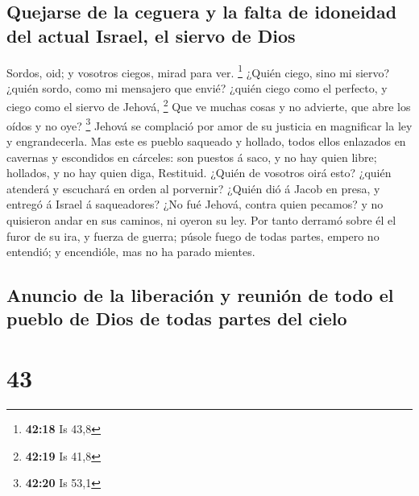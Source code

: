 \hypertarget{quejarse-de-la-ceguera-y-la-falta-de-idoneidad-del-actual-israel-el-siervo-de-dios}{%
\subsection{Quejarse de la ceguera y la falta de idoneidad del actual
Israel, el siervo de
Dios}\label{quejarse-de-la-ceguera-y-la-falta-de-idoneidad-del-actual-israel-el-siervo-de-dios}}

 Sordos, oid; y vosotros ciegos, mirad para ver.
\footnote{\textbf{42:18} Is 43,8}  ¿Quién ciego, sino mi
siervo? ¿quién sordo, como mi mensajero que envié? ¿quién ciego como el
perfecto, y ciego como el siervo de Jehová, \footnote{\textbf{42:19} Is
  41,8}  Que ve muchas cosas y no advierte, que abre los
oídos y no oye? \footnote{\textbf{42:20} Is 53,1}  Jehová
se complació por amor de su justicia en magnificar la ley y
engrandecerla.  Mas este es pueblo saqueado y hollado,
todos ellos enlazados en cavernas y escondidos en cárceles: son puestos
á saco, y no hay quien libre; hollados, y no hay quien diga, Restituid.
 ¿Quién de vosotros oirá esto? ¿quién atenderá y
escuchará en orden al porvernir?  ¿Quién dió á Jacob en
presa, y entregó á Israel á saqueadores? ¿No fué Jehová, contra quien
pecamos? y no quisieron andar en sus caminos, ni oyeron su ley.
 Por tanto derramó sobre él el furor de su ira, y fuerza
de guerra; púsole fuego de todas partes, empero no entendió; y
encendióle, mas no ha parado mientes.

\hypertarget{anuncio-de-la-liberaciuxf3n-y-reuniuxf3n-de-todo-el-pueblo-de-dios-de-todas-partes-del-cielo}{%
\subsection{Anuncio de la liberación y reunión de todo el pueblo de Dios
de todas partes del
cielo}\label{anuncio-de-la-liberaciuxf3n-y-reuniuxf3n-de-todo-el-pueblo-de-dios-de-todas-partes-del-cielo}}

\hypertarget{section-42}{%
\section{43}\label{section-42}}

